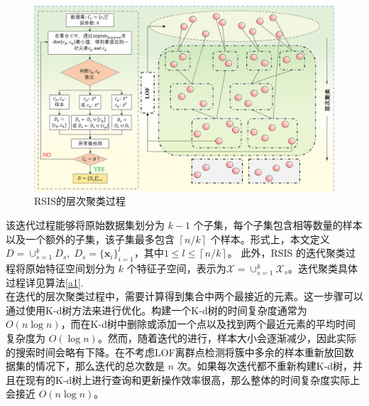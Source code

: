 \documentclass{NauThesis}
\begin{document}
\begin{figure}[htbp]
    \centering
    \includegraphics[width=1\textwidth]{figs/fig2.png}
    \caption{RSIS的层次聚类过程}
    \label{fig2}
\end{figure}

该迭代过程能够将原始数据集划分为 \(k-1\) 个子集，每个子集包含相等数量的样本以及一个额外的子集，该子集最多包含 \(\left\lceil n/k \right\rceil\) 个样本。形式上，本文定义
\(D=\cup_{s=1}^k D_s,\;  D_s=\{\boldsymbol{x}_i\}_{i=1}^l\)，其中\(1 \leq l \leq \left\lceil {n/k} \right\rceil\)。
此外，RSIS 的迭代聚类过程将原始特征空间划分为 \(k\) 个特征子空间，表示为\(\mathcal{X} = \cup_{s=1}^{k} \mathcal{X}_s\)。迭代聚类具体过程详见算法\ref{a1}.
\\\hspace*{2em}在迭代的层次聚类过程中，需要计算得到集合中两个最接近的元素。这一步骤可以通过使用K-d树方法来进行优化。构建一个K-d树的时间复杂度通常为 \(O(n\log{n})\)，而在K-d树中删除或添加一个点以及找到两个最近元素的平均时间复杂度为 \(O(\log{n})\)。然而，随着迭代的进行，样本大小会逐渐减少，因此实际的搜索时间会略有下降。在不考虑LOF离群点检测将簇中多余的样本重新放回数据集的情况下，那么迭代的总次数是 \(n\) 次。如果每次迭代都不重新构建K-d树，并且在现有的K-d树上进行查询和更新操作效率很高，那么整体的时间复杂度实际上会接近 \(O(n\log{n})\)。
\end{document}
